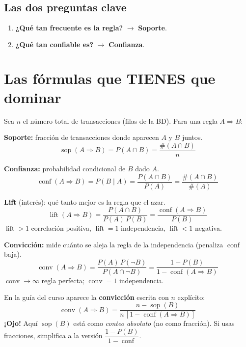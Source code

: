 \documentclass[11pt,a4paper]{article}
\newcommand{\conf}{\operatorname{conf}}
\newcommand{\sop}{\operatorname{sop}}
\newcommand{\lift}{\operatorname{lift}}
\newcommand{\conv}{\operatorname{conv}}
\begin{document}
\subsection{Las dos preguntas clave}
\begin{enumerate}
    \item \textbf{¿Qué tan frecuente es la regla?} $\to$ \textbf{Soporte}.
    \item \textbf{¿Qué tan confiable es?} $\to$ \textbf{Confianza}.
\end{enumerate}

\section{Las fórmulas que TIENES que dominar}

Sea $n$ el número total de transacciones (filas de la BD). Para una regla $A \Rightarrow B$:

\begin{formulabox}
\textbf{Soporte:} fracción de transacciones donde aparecen $A$ y $B$ juntos.
\[
\sop(A \Rightarrow B) = P(A \cap B) = \frac{\#(A \cap B)}{n}
\]

\textbf{Confianza:} probabilidad condicional de $B$ dado $A$.
\[
\conf(A \Rightarrow B) = P(B \mid A) = \frac{P(A \cap B)}{P(A)} = \frac{\#(A \cap B)}{\#(A)}
\]

\textbf{Lift} (interés): qué tanto mejor es la regla que el azar.
\[
\lift(A \Rightarrow B) = \frac{P(A \cap B)}{P(A)\,P(B)} = \frac{\conf(A \Rightarrow B)}{P(B)}
\]
$\lift > 1$ correlación positiva, $\lift = 1$ independencia, $\lift < 1$ negativa.

\textbf{Convicción:} mide cuánto se aleja la regla de la independencia (penaliza $\conf$ baja).
\[
\conv(A \Rightarrow B) = \frac{P(A)\,P(\neg B)}{P(A \cap \neg B)} = \frac{1 - P(B)}{1 - \conf(A \Rightarrow B)}
\]
$\conv \to \infty$ regla perfecta; $\conv = 1$ independencia.
\end{formulabox}

\begin{tipbox}
En la guía del curso aparece la \textbf{convicción} escrita con $n$ explícito:
\[
\conv(A \Rightarrow B) = \frac{n - \sop(B)}{n\,[1 - \conf(A \Rightarrow B)]}
\]
\textbf{¡Ojo!} Aquí $\sop(B)$ está como \emph{conteo absoluto} (no como fracción). Si usas
fracciones, simplifica a la versión $\dfrac{1-P(B)}{1-\conf}$.
\end{tipbox}
\end{document}

